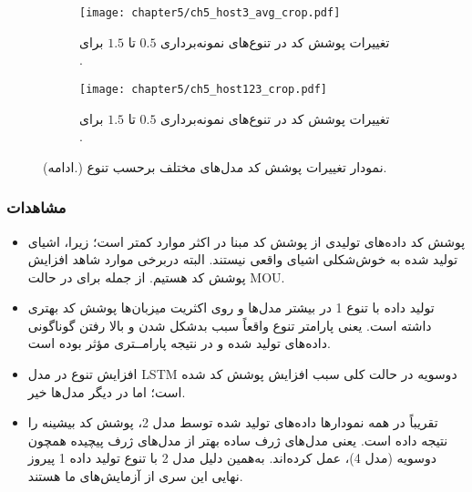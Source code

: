  \begin{figure}%
 	\ContinuedFloat
 
 \begin{subfigure}{\linewidth}
	\centering
	\texttt{[image: chapter5/ch5\_host3\_avg\_crop.pdf]}
	\caption[ تغییرات پوشش کد در تنوع‌های نمونه‌برداری $0.5$ تا $1.5$  برای  ]
	{
		تغییرات پوشش کد در تنوع‌های نمونه‌برداری $0.5$ تا $1.5$  برای .
	}
	\label{ch5_host3_avg_crop.pdf}
	
\end{subfigure}
 \vspace{0.75cm}
 
 \begin{subfigure}{\linewidth}
 	\centering
 	\texttt{[image: chapter5/ch5\_host123\_crop.pdf]}
 	\caption[تغییرات پوشش کد در تنوع‌های نمونه‌برداری $0.5$ تا $1.5$  برای  ]
 	{
 	تغییرات پوشش کد در تنوع‌های نمونه‌برداری $0.5$ تا $1.5$  برای .
 	}
 	\label{ch5_host123_crop.pdf}

\end{subfigure}
\vspace{1cm}

\caption[]{(ادامه.)
	نمودار تغییرات پوشش کد مدل‌های مختلف برحسب تنوع.    
}

 \end{figure}




 \subsubsection{مشاهدات}
 \begin{itemize}
 	\item {
 	پوشش کد داده‌های تولیدی از پوشش کد مبنا در اکثر موارد کمتر است؛ زیرا، اشیای تولید شده به خوش‌شکلی اشیای واقعی نیستند. البته دربرخی موارد شاهد افزایش پوشش کد هستیم. از جمله برای  
 در حالت \gls{MOU}.
}
\item{
تولید داده با تنوع 1 در بیشتر مدل‌ها و روی اکثریت میزبان‌ها پوشش کد بهتری داشته است. یعنی پارامتر تنوع واقعاً سبب بدشکل شدن و بالا رفتن گوناگونی داده‌های تولید شده و در نتیجه پارامــتری مؤثر بوده است.
	
}

\item{
	
	افزایش تنوع در مدل \gls{LSTM} دوسویه در حالت کلی سبب افزایش پوشش کد شده است؛ اما در دیگر مدل‌ها خیر.

}

\item{
تقریباً در همه نمودارها داده‌های تولید شده توسط مدل 2، پوشش کد بیشینه را نتیجه داده است. یعنی مدل‌های ژرف ساده بهتر از مدل‌های ژرف پیچیده همچون  دوسویه (مدل 4)، عمل کرده‌اند. به‌همین دلیل مدل 2 با تنوع تولید داده 1 پیروز نهایی این سری از آزمایش‌های ما هستند.

}

 \end{itemize}


